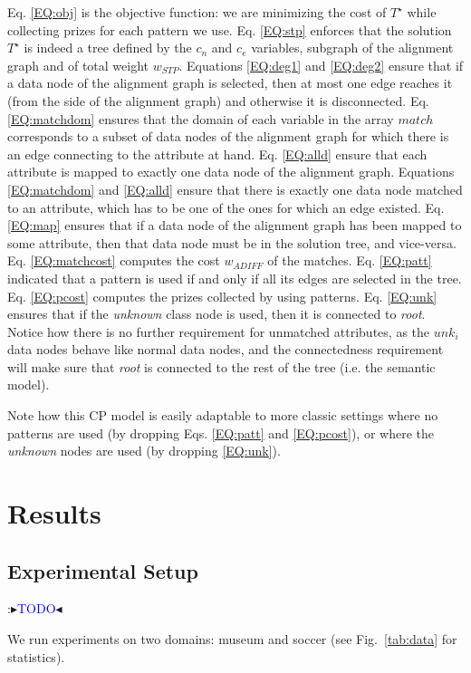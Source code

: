\documentclass[letterpaper]{article} %
\newcommand{\authornote}[3]{
  {\fbox{\sc 
  #1}:$\blacktriangleright$\textcolor{#2}{\small{#3}}$\blacktriangleleft$}%
}
\newcommand{\ddg}[1]{\authornote{DDG}{blue}{#1}}
\begin{document}
Eq. \ref{EQ:obj} is the objective function: we are minimizing the cost 
of $T^\star$ while collecting prizes for each pattern we use. Eq. \ref{EQ:stp} 
enforces that the solution 
$T^\star$ is indeed a tree defined by the $c_n$ and $c_e$ variables, subgraph 
of the alignment graph 
and of total weight $w_{STP}$. Equations \ref{EQ:deg1} and \ref{EQ:deg2} ensure 
that if a data node of the alignment graph is selected, then at most one edge 
reaches it (from the side of the alignment graph) and otherwise it is 
disconnected. Eq. \ref{EQ:matchdom} ensures that the domain of each variable in 
the array $match$ corresponds to a subset of data nodes of the alignment graph 
for which there is an edge connecting to the attribute at hand. Eq. 
\ref{EQ:alld} ensure that each attribute is mapped to exactly one data node of 
the alignment graph. Equations \ref{EQ:matchdom} and \ref{EQ:alld} ensure that 
there is exactly one data node matched to an attribute, which has to be one of 
the ones for which an edge existed. Eq. \ref{EQ:map} ensures that 
if a data node of the alignment graph has been mapped to some attribute, then 
that data node must be in the solution tree, and vice-versa. Eq. 
\ref{EQ:matchcost} computes the cost $w_{ADIFF}$ of the matches.
Eq. \ref{EQ:patt} indicated that a pattern is used if and only if all its edges 
are selected in the tree. Eq. \ref{EQ:pcost} computes the prizes collected by using patterns.
Eq. \ref{EQ:unk} ensures that if the \emph{unknown} class node is used, then it 
is connected to \emph{root}.
Notice how there is no further requirement for unmatched attributes, as the 
$unk_i$ data nodes behave like normal data nodes, and the connectedness 
requirement will make sure that \emph{root} is connected to the rest of the 
tree (i.e. the semantic model).

Note how this CP model is easily adaptable to more classic settings where no 
patterns are used (by dropping Eqs. \ref{EQ:patt} and \ref{EQ:pcost}), or where 
the \emph{unknown} nodes are used (by dropping \ref{EQ:unk}).
\section{Results \label{SEC:Res}}

\subsection{Experimental Setup}
\ddg{TODO}

We run experiments on two domains: museum and soccer (see Fig.~\ref{tab:data} for statistics).
\end{document}
